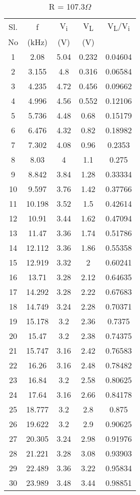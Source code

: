\documentclass[a4paper]{article}
\begin{document}
\begin{table}[H]
\begin{center}
    \caption{R = 107.3$\Omega$}
    \label{tab:table1}
\resizebox{6cm}{!} {
   \begin{tabular}{|c|c|c|c|c|}
   \hline
Sl. & f    & V\textsubscript{\tiny i} & V\textsubscript{\tiny L} & V\textsubscript{\tiny L}/V\textsubscript{\tiny i}\\
No & (kHz)   & (V) & (V) & \\
\hline
1  & 2.08   & 5.04 & 0.232 & 0.04604 \\
2  & 3.155  & 4.8  & 0.316 & 0.06584 \\
3  & 4.235  & 4.72 & 0.456 & 0.09662 \\
4  & 4.996  & 4.56 & 0.552 & 0.12106 \\
5  & 5.736  & 4.48 & 0.68  & 0.15179 \\
6  & 6.476  & 4.32 & 0.82  & 0.18982 \\
7  & 7.302  & 4.08 & 0.96  & 0.2353  \\
8  & 8.03   & 4    & 1.1   & 0.275   \\
9  & 8.842  & 3.84 & 1.28  & 0.33334 \\
10 & 9.597  & 3.76 & 1.42  & 0.37766 \\
11 & 10.198 & 3.52 & 1.5   & 0.42614 \\
12 & 10.91  & 3.44 & 1.62  & 0.47094 \\
13 & 11.47  & 3.36 & 1.74  & 0.51786 \\
14 & 12.112 & 3.36 & 1.86  & 0.55358 \\
15 & 12.919 & 3.32 & 2     & 0.60241 \\
16 & 13.71  & 3.28 & 2.12  & 0.64635 \\
17 & 14.292 & 3.28 & 2.22  & 0.67683 \\
18 & 14.749 & 3.24 & 2.28  & 0.70371 \\
19 & 15.178 & 3.2  & 2.36  & 0.7375  \\
20 & 15.47  & 3.2  & 2.38  & 0.74375 \\
21 & 15.747 & 3.16 & 2.42  & 0.76583 \\
22 & 16.26  & 3.16 & 2.48  & 0.78482 \\
23 & 16.84  & 3.2  & 2.58  & 0.80625 \\
24 & 17.64  & 3.16 & 2.66  & 0.84178 \\
25 & 18.777 & 3.2  & 2.8   & 0.875   \\
26 & 19.622 & 3.2  & 2.9   & 0.90625 \\
27 & 20.305 & 3.24 & 2.98  & 0.91976 \\
28 & 21.221 & 3.28 & 3.08  & 0.93903 \\
29 & 22.489 & 3.36 & 3.22  & 0.95834 \\
30 & 23.989 & 3.48 & 3.44  & 0.98851 \\
\hline
\end{tabular}
}
\end{center}
\end{table}
%
\end{document}
